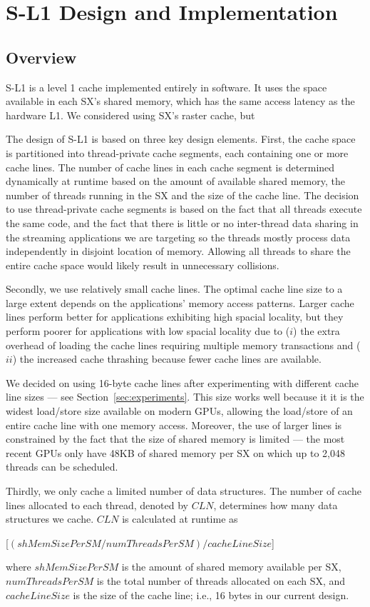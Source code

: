 \section{S-L1 Design and Implementation} \label{sec:design}
\subsection{Overview}
S-L1 is a level 1 cache implemented entirely in software.
It uses the space available in each SX's shared memory, which has the same access latency as the hardware L1.
We considered using SX's raster cache, but 

The design of S-L1 is based on three key design elements.
First, the cache space is partitioned into thread-private cache segments, each containing one or more cache lines. 
The number of cache lines in each cache segment is determined dynamically at runtime based on the amount of available shared memory, the number of threads running in the SX and the size of the cache line. 
The decision to use thread-private cache segments is based on the fact that all threads execute the same code, and the fact that there is little or no inter-thread data sharing in the streaming applications we are targeting so the threads mostly process data independently in disjoint location of memory.
Allowing all threads to share the entire cache space would likely result in unnecessary collisions.

Secondly, we use relatively small cache lines. 
The optimal cache line size to a large extent depends on the applications' memory access patterns.
Larger cache lines perform better for applications exhibiting high spacial locality,
but they perform poorer for applications with low spacial locality due to ($i$) the extra overhead of loading the cache lines requiring multiple memory transactions and ($ii$) the increased cache thrashing because fewer cache lines are available.
 
We decided on using 16-byte cache lines after experimenting with different cache line sizes --- see Section~\ref{sec:experiments}. 
This size works well because it it is the widest load/store size available on modern GPUs,
allowing the load/store of an entire cache line with one memory access.
Moreover, the use of larger lines is constrained by the fact that the size of shared memory is limited --- the most recent GPUs only have 48KB of shared memory per SX on which up to 2,048 threads can be scheduled.

Thirdly, we only cache a limited number of data structures.
The number of cache lines allocated to each thread, denoted by $CLN$, determines how many data structures we cache.
$CLN$ is calculated at runtime as
\begin{center} 
[$(shMemSizePerSM / numThreadsPerSM) / cacheLineSize$]
\end{center}
where $shMemSizePerSM$ is the amount of shared memory available per SX, $numThreadsPerSM$ is the total number of threads allocated on each SX, and $cacheLineSize$ is the size of the cache line; i.e., 16 bytes in our current design. 

